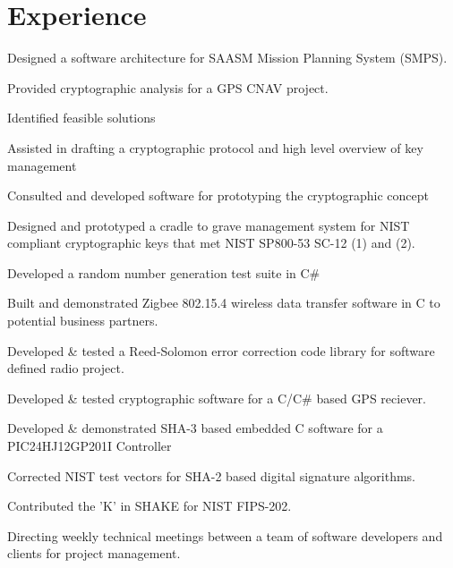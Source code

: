 \documentclass[letterpaper]{deedy-resume} %
\begin{document}
\begin{minipage}[t]{0.66\textwidth} %


\section{Experience}


\vspace{\topsep} %
\begin{tightitemize}
\item Designed a software architecture for SAASM Mission Planning System (SMPS).
\item Provided cryptographic analysis for a GPS CNAV project.
\begin{tightitemize}
\item Identified feasible solutions
\item Assisted in drafting a cryptographic protocol and high level overview of key management
\item Consulted and developed software for prototyping the cryptographic concept
\end{tightitemize}
\item Designed and prototyped a cradle to grave management system for NIST compliant cryptographic keys that met NIST SP800-53 SC-12 (1) and (2).
\item Developed a random number generation test suite in C\#
\item Built and demonstrated Zigbee 802.15.4 wireless data transfer software in C to potential business partners.
\item Developed \& tested a Reed-Solomon error correction code library for software defined radio project.
\item Developed \& tested cryptographic software for a C/C\# based GPS reciever.
\item Developed \& demonstrated SHA-3 based embedded C software for a PIC24HJ12GP201I Controller
\item Corrected NIST test vectors for SHA-2 based digital signature algorithms.
\item Contributed the 'K' in SHAKE for NIST FIPS-202.
\item Directing weekly technical meetings between a team of software developers and clients for project management.
\end{tightitemize}


\end{minipage}
\end{document}
